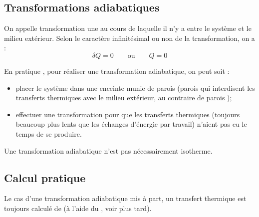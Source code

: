 \subsection{Transformations adiabatiques}

\begin{definition}
On appelle transformation  une  au cours de laquelle il n'y a  entre le système et le milieu extérieur. Selon le caractère infinitésimal ou non de la transformation, on a :
\[\delta Q = 0 \qquad \text{ou} \qquad Q = 0\]
\end{definition}

\begin{remarque}
En pratique , pour réaliser une transformation adiabatique, on peut soit :

\begin{itemize}
\item placer le système dans une enceinte  munie de parois  (parois qui interdisent les transferts thermiques avec le milieu extérieur, au contraire de parois );

\item effectuer une transformation  pour que les transferts thermiques (toujours beaucoup plus lents que les échanges d'énergie par travail) n'aient pas eu le temps de se produire.
\end{itemize}
\end{remarque}

\begin{attention}
Une transformation adiabatique n'est pas nécessairement isotherme.
\end{attention}



\subsection{Calcul pratique}

\begin{remarque}
Le cas d'une transformation adiabatique mis à part, un transfert thermique est toujours calculé de  (à l'aide du , voir plus tard).
\end{remarque}